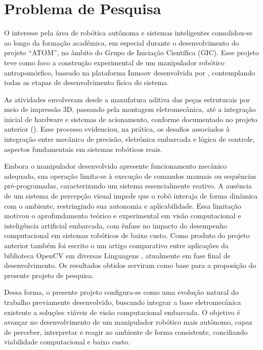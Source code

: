 \chapter*{Problema de Pesquisa}

O interesse pela área de robótica autônoma e sistemas inteligentes consolidou-se ao longo da formação acadêmica, em especial durante o desenvolvimento do projeto “ATOM”, no âmbito do Grupo de Iniciação Científica (GIC). Esse projeto teve como foco a construção experimental de um manipulador robótico antropomórfico, baseado na plataforma Inmoov desenvolvida por , contemplando todas as etapas de desenvolvimento físico do sistema.

As atividades envolveram desde a manufatura aditiva das peças estruturais por meio de impressão 3D, passando pela montagem eletromecânica, até a integração inicial de hardware e sistemas de acionamento, conforme documentado no projeto anterior (). Esse processo evidenciou, na prática, os desafios associados à integração entre mecânica de precisão, eletrônica embarcada e lógica de controle, aspectos fundamentais em sistemas robóticos reais.

Embora o manipulador desenvolvido apresente funcionamento mecânico adequado, sua operação limita-se à execução de comandos manuais ou sequências pré-programadas, caracterizando um sistema essencialmente reativo. A ausência de um sistema de percepção visual impede que o robô interaja de forma dinâmica com o ambiente, restringindo sua autonomia e aplicabilidade. Essa limitação motivou o aprofundamento teórico e experimental em visão computacional e inteligência artificial embarcada, com ênfase no impacto do desempenho computacional em sistemas robóticos de baixo custo. Como produto do projeto anterior também foi escrito o um artigo comparativo entre aplicações da biblioteca OpenCV em diversas Linguagens , atualmente em fase final de desenvolvimento. Os resultados obtidos serviram como base para a proposição do presente projeto de pesquisa.

Dessa forma, o presente projeto configura-se como uma evolução natural do trabalho previamente desenvolvido, buscando integrar a base eletromecânica existente a soluções viáveis de visão computacional embarcada. O objetivo é avançar no desenvolvimento de um manipulador robótico mais autônomo, capaz de perceber, interpretar e reagir ao ambiente de forma consistente, conciliando viabilidade computacional e baixo custo.